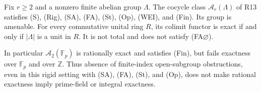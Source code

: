 \begin{theorem}
\label{A:finite-cocycles}
Fix $r\geq2$ and a nonzero finite abelian group $\Lambda$.
The cocycle class $\mathcal A_r(\Lambda)$ of R13 satisfies (S),
(Rig), (SA), (FA), (St), (Op), (WEI), and (Fin). Its group is
amenable. For every commutative unital ring $R$, its colimit functor
is exact if and only if $|\Lambda|$ is a unit in $R$.
It is not total and does not satisfy (FA$\varnothing$).

In particular $\mathcal A_2(\mathbb F_p)$ is rationally exact and
satisfies (Fin), but fails exactness over $\mathbb F_p$ and over
$\mathbb Z$. Thus absence of finite-index open-subgroup obstructions,
even in this rigid setting with (SA), (FA), (St), and (Op), does not
make rational exactness imply prime-field or integral exactness.
\end{theorem}
